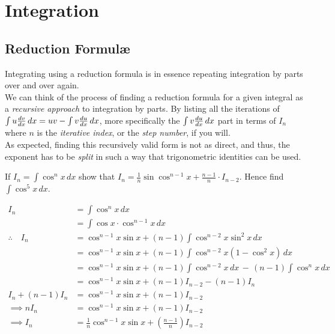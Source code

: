 \documentclass{standalone}
\begin{document}
	\chapter{Integration}
	\section{Reduction Formul\ae}
	Integrating using a reduction formula is in essence repeating integration by parts over and over again.\\
	
	
	 We can think of the process of finding a reduction formula for a given integral as a \emph{recursive approach} to integration by parts. By listing all the iterations of $\textstyle\int u\frac{dv}{dx}\,dx= uv-\int v\frac{du}{dx}\,dx$, more specifically the $\textstyle\int v\frac{du}{dx}\,dx$ part in terms of $I_n$ where $n$ is the \emph{iterative index}, or the \textit{step number}, if you will.\\
	
	As expected, finding this recursively valid form is not as direct, and thus, the exponent has to be \textit{split} in such a way that trigonometric identities can be used.
	\begin{example}
		If $I_n = \int \cos^n x \, dx$ show that $I_n = \frac{1}{n} \sin\cos^{n-1}x + \frac{n-1}{n}\cdot I_{n-2}$. Hence find $\int \cos^5x\, dx$.
	\end{example}
	
	\begin{align*}
		I_n                  & = \int \cos^n x \, dx                                                       \\
		& = \int \cos x \cdot \cos^{n-1}x\, dx                                        \\
		\therefore \quad I_n & = \cos^{n-1}x\sin x + (n-1)\int\cos^{n-2}x\sin^2x\,dx                       \\
		& = \cos^{n-1}x\sin x + (n-1)\int\cos^{n-2}x(1-\cos^2x)\,dx                   \\
		& = \cos^{n-1}x\sin x + (n-1)\int\cos^{n-2}x \, dx \,-\, (n-1)\int\cos^nx\,dx \\
		& = \cos^{n-1}x\sin x + (n-1)I_{n-2} - (n-1)I_n                               \\
		I_n + (n-1)I_n       & = \cos^{n-1}x\sin x + (n-1)I_{n-2}                                          \\
		\implies  nI_n       & = \cos^{n-1}x\sin x + (n-1)I_{n-2}                                          \\
		\implies I_n         & = \frac1n\cos^{n-1}x\sin x + \left(\frac{n-1}n\right)I_{n-2}                \\
	\end{align*}
	
\end{document}
